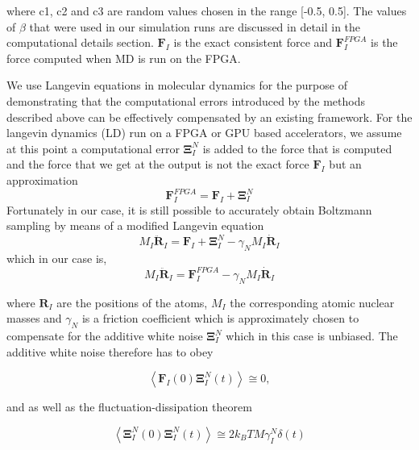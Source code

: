 \documentclass[aps,pre,twocolumn,showpacs,preprintnumbers,amsmath,amssymb]{revtex4-1}
\begin{document}
where c1, c2 and c3 are random values chosen in the range [-0.5, 0.5]. The values of \(\beta\) that were used in our simulation runs are discussed in detail in the computational details section. \(\textbf{F}_{I}\) is the exact consistent force and \(\textbf{F}_{I}^{FPGA}\) is the force computed when MD is run on the FPGA.

We use Langevin equations in molecular dynamics for the purpose of demonstrating that the computational errors introduced by the methods described above can be effectively compensated by an existing framework. 
For the langevin dynamics (LD) run on a FPGA or GPU based accelerators, we assume at this point a computational error \(\mathbf{\Xi }_{I}^{N}\) is added to the force that is computed and the force that we get at the output is not the exact force \(\textbf{F}_{I}\) but an approximation
\begin{equation}
\textbf{F}_{I}^{FPGA} = \textbf{F}_{I}+ \mathbf{\Xi }_{I}^{N}
\end{equation} 
Fortunately in our case, it is still possible to accurately obtain Boltzmann sampling by means of a modified Langevin equation 
\begin{equation}
M_{I}\ddot{\textbf{R}}_{I}=\textbf{F}_{I}+\mathbf{\Xi }_{I}^{N}-\gamma _{N}M_{I}\dot{\textbf{R}}_{I} 
\end{equation}
which in our case is,
\begin{equation}
M_{I}\ddot{\textbf{R}}_{I} = \textbf{F}_{I}^{FPGA}-\gamma _{N}M_{I}\dot{\textbf{R}}_{I}
\end{equation}

where \(\textbf{R}_{I}\) are the positions of the atoms, \(M_{I}\) the corresponding atomic nuclear masses and \(\gamma _{N}\) is a friction coefficient which is approximately chosen to compensate for the additive white noise \(\mathbf{\Xi }_{I}^{N}\) which in this case is unbiased.
The additive white noise therefore has to obey

\begin{equation}
 \left \langle \textbf{F}_{I}\left ( 0 \right ) \mathbf{\Xi } _{I}^{N}\left ( t \right )\right \rangle \cong  0,
\end{equation}

and as well as the fluctuation-dissipation theorem

\begin{equation}
\left \langle \mathbf{\Xi } _{I}^{N}\left ( 0 \right ) \mathbf{\Xi } _{I}^{N}\left ( t \right ) \right \rangle \cong  2k_{B}TM\gamma _{I}^{N}\delta \left ( t \right )
\end{equation}  
\end{document}
